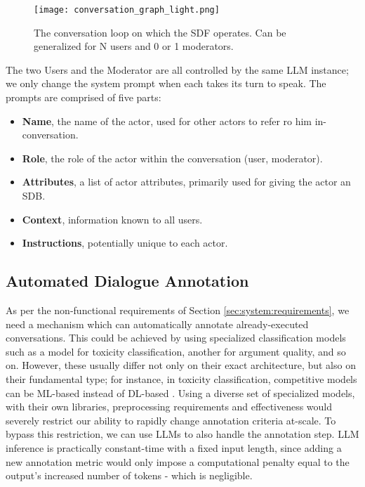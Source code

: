 \begin{figure}
	\centering
	\texttt{[image: conversation\_graph\_light.png]}
	\caption{The conversation loop on which the SDF operates. Can be generalized for N users and 0 or 1 moderators.}
	\label{fig::conversation}
\end{figure}

The two Users and the Moderator are all controlled by the same LLM instance; we only change the system prompt when each takes its turn to speak. The prompts are comprised of five parts:

\begin{itemize}
	\item \textbf{Name}, the name of the actor, used for other actors to refer ro him in-conversation.
	\item \textbf{Role}, the role of the actor within the conversation (user, moderator).
	\item \textbf{Attributes}, a list of actor attributes, primarily used for giving the actor an SDB.
	\item \textbf{Context}, information known to all users.
	\item \textbf{Instructions}, potentially unique to each actor. 
\end{itemize}


\subsection{Automated Dialogue Annotation}

As per the non-functional requirements of Section \ref{sec:system:requirements}, we need a mechanism which can automatically annotate already-executed conversations. This could be achieved by using specialized classification models such as a model for toxicity classification, another for argument quality, and so on. However, these usually differ not only on their exact architecture, but also on their fundamental type; for instance, in toxicity classification, competitive models can be ML-based instead of DL-based \cite{anjum2024hate}. Using a diverse set of specialized models, with their own libraries, preprocessing requirements and effectiveness would severely restrict our ability to rapidly change annotation criteria at-scale. To bypass this restriction, we can use LLMs to also handle the annotation step. LLM inference is practically constant-time with a fixed input length, since adding a new annotation metric would only impose a computational penalty equal to the output's increased number of tokens - which is negligible. 

